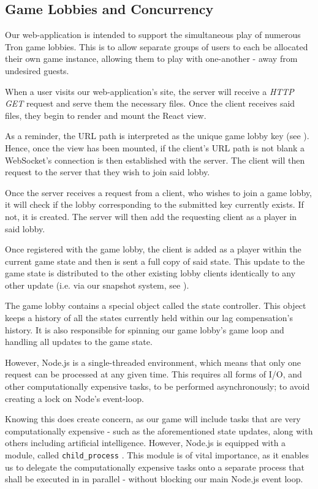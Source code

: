 \documentclass{standalone}
\begin{document}
		\subsection{Game Lobbies and Concurrency} \label{sec:lobbyConcurrency}
			Our web-application is intended to support the simultaneous play of numerous Tron game lobbies. This is to allow separate groups of users to each be allocated their own game instance, allowing them to play with one-another - away from undesired guests.

			When a user visits our web-application's site, the server will receive a \emph{HTTP GET} request and serve them the necessary files. Once the client receives said files, they begin to render and mount the React view.

			As a reminder, the URL path is interpreted as the unique game lobby key (see ). Hence, once the view has been mounted, if the client's URL path is not blank a WebSocket's connection is then established with the server. The client will then request to the server that they wish to join said lobby.

			Once the server receives a request from a client, who wishes to join a game lobby, it will check if the lobby corresponding to the submitted key currently exists. If not, it is created. The server will then add the requesting client as a player in said lobby.

			Once registered with the game lobby, the client is added as a player within the current game state and then is sent a full copy of said state. This update to the game state is distributed to the other existing lobby clients identically to any other update (i.e. via our snapshot system, see ).

			The game lobby contains a special object called the state controller. This object keeps a history of all the states currently held within our lag compensation's history. It is also responsible for spinning our game lobby's game loop and handling all updates to the game state.

			However, Node.js is a single-threaded environment, which means that only one request can be processed at any given time. This requires all forms of I/O, and other computationally expensive tasks, to be performed asynchronously; to avoid creating a lock on Node's event-loop.

			Knowing this does create concern, as our game will include tasks that are very computationally expensive - such as the aforementioned state updates, along with others including artificial intelligence. However, Node.js is equipped with a module, called \texttt{child\_process} \parencite{nodeChildProcess}. This module is of vital importance, as it enables us to delegate the computationally expensive tasks onto a separate process that shall be executed in in parallel - without blocking our main Node.js event loop.
\end{document}
